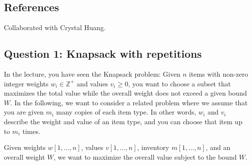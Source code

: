 \def\lc{\left\lceil}   
\def\rc{\right\rceil}
\runningheadrule
\firstpageheadrule
\cfoot{}
\subsection*{References}
Collaborated with Crystal Huang.
\subsection*{Question 1: Knapsack with repetitions}
In the lecture, you have seen the Knapsack problem: 
Given $n$ items with non-zero integer weights $w_i \in \mathbb{Z}^+$ and values $v_i \geq 0$, you want to choose a subset that maximizes the total value while the overall weight does not exceed a given bound $W$.
In the following, we want to consider a related problem where we assume that you are given $m_i$ many copies of each item type. In other words, $w_i$ and $v_i$ describe the weight and value of an item type, and you can choose that item up to $m_i$ times.

Given weights $w[1,\ldots,n]$, values $v[1,\ldots,n]$, inventory $m[1,\ldots,n]$, and an overall weight $W$, we want to maximize the overall value subject to the bound $W$. 

